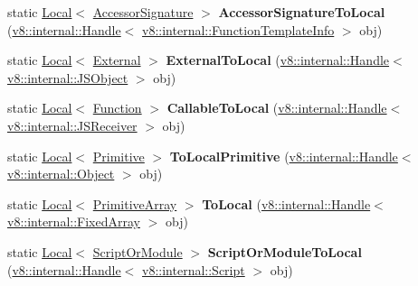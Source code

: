 \begin{DoxyCompactItemize}
static \mbox{\hyperlink{classv8_1_1Local}{Local}}$<$ \mbox{\hyperlink{classv8_1_1AccessorSignature}{Accessor\+Signature}} $>$ {\bfseries Accessor\+Signature\+To\+Local} (\mbox{\hyperlink{classv8_1_1internal_1_1Handle}{v8\+::internal\+::\+Handle}}$<$ \mbox{\hyperlink{classv8_1_1internal_1_1FunctionTemplateInfo}{v8\+::internal\+::\+Function\+Template\+Info}} $>$ obj)
\item 
\mbox{\label{classv8_1_1Utils_aa043b78045a591d4a6d99b89b070bc28}} 
static \mbox{\hyperlink{classv8_1_1Local}{Local}}$<$ \mbox{\hyperlink{classv8_1_1External}{External}} $>$ {\bfseries External\+To\+Local} (\mbox{\hyperlink{classv8_1_1internal_1_1Handle}{v8\+::internal\+::\+Handle}}$<$ \mbox{\hyperlink{classv8_1_1internal_1_1JSObject}{v8\+::internal\+::\+J\+S\+Object}} $>$ obj)
\item 
\mbox{\label{classv8_1_1Utils_a41685e0a85f806885ba2438046d9f0cf}} 
static \mbox{\hyperlink{classv8_1_1Local}{Local}}$<$ \mbox{\hyperlink{classv8_1_1Function}{Function}} $>$ {\bfseries Callable\+To\+Local} (\mbox{\hyperlink{classv8_1_1internal_1_1Handle}{v8\+::internal\+::\+Handle}}$<$ \mbox{\hyperlink{classv8_1_1internal_1_1JSReceiver}{v8\+::internal\+::\+J\+S\+Receiver}} $>$ obj)
\item 
\mbox{\label{classv8_1_1Utils_a3b5c733116fe8636ac66ce3caff44fa5}} 
static \mbox{\hyperlink{classv8_1_1Local}{Local}}$<$ \mbox{\hyperlink{classv8_1_1Primitive}{Primitive}} $>$ {\bfseries To\+Local\+Primitive} (\mbox{\hyperlink{classv8_1_1internal_1_1Handle}{v8\+::internal\+::\+Handle}}$<$ \mbox{\hyperlink{classv8_1_1internal_1_1Object}{v8\+::internal\+::\+Object}} $>$ obj)
\item 
\mbox{\label{classv8_1_1Utils_a9ce5b8874d7878dde4fe62e1e6b3abce}} 
static \mbox{\hyperlink{classv8_1_1Local}{Local}}$<$ \mbox{\hyperlink{classv8_1_1PrimitiveArray}{Primitive\+Array}} $>$ {\bfseries To\+Local} (\mbox{\hyperlink{classv8_1_1internal_1_1Handle}{v8\+::internal\+::\+Handle}}$<$ \mbox{\hyperlink{classv8_1_1internal_1_1FixedArray}{v8\+::internal\+::\+Fixed\+Array}} $>$ obj)
\item 
\mbox{\label{classv8_1_1Utils_a1b70690e1d71bd6e90360c89962475c1}} 
static \mbox{\hyperlink{classv8_1_1Local}{Local}}$<$ \mbox{\hyperlink{classv8_1_1ScriptOrModule}{Script\+Or\+Module}} $>$ {\bfseries Script\+Or\+Module\+To\+Local} (\mbox{\hyperlink{classv8_1_1internal_1_1Handle}{v8\+::internal\+::\+Handle}}$<$ \mbox{\hyperlink{classv8_1_1internal_1_1Script}{v8\+::internal\+::\+Script}} $>$ obj)

\end{DoxyCompactItemize}
